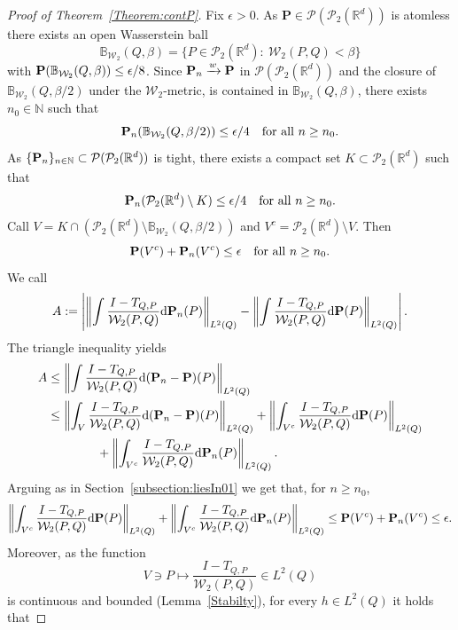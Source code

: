 \documentclass{imsart}
\numberwithin{equation}{section}
\def\N{\mathbb{N}}
\def\R{\mathbb{R}}
\def\N{\mathbb N}
\begin{document}
\begin{proof}[Proof of Theorem~\ref{Theorem:contP}]
	Fix $\epsilon>0$. As $\mathbf{P}\in \mathcal{P}(\mathcal{P}_{2}(\R^d)) $ is atomless there exists an open  Wasserstein ball
	$$ \mathbb{B}_{\mathcal{W}_2}(Q,\beta)=\{P\in \mathcal{P}_{2}(\R^d): \ \mathcal{W}_2(P,Q)< \beta\}$$
	with ${\bf P}(\mathbb{B}_{\mathcal{W}_2}(Q,\beta))\leq \epsilon/8$. Since ${\bf P}_n \xrightarrow{w} {\bf P} $ in $\mathcal{P}(\mathcal{P}_{2}(\R^d))$ and the closure of $\mathbb{B}_{\mathcal{W}_2}(Q,\beta/2)$ under the $\mathcal{W}_{2} $-metric,
	is contained in 
	$  \mathbb{B}_{\mathcal{W}_2}(Q,\beta) $,  there exists $n_0\in \N$  such that 
	$$  {\bf P}_n(\mathbb{B}_{\mathcal{W}_2}(Q,\beta/2)) \leq \epsilon/4 \quad \text{for all } n\geq n_0.$$
	As $\{{\bf P}_n\}_{n\in \N}\subset  \mathcal{P}(\mathcal{P}_{2}(\R^d)) $ is tight, there exists a compact set $K\subset \mathcal{P}_{2}(\R^d)$ such that 
	$$ {\bf P}_n(\mathcal{P}_{2}(\R^d)\setminus K) \leq \epsilon/4 \quad \text{for all } n\geq n_0. $$
	Call 
	$V= K\cap (\mathcal{P}_{2}(\R^d)\setminus \mathbb{B}_{\mathcal{W}_2}(Q,\beta/2))$ and $V^c= \mathcal{P}_{2}(\R^d)\setminus V$. Then 
	$$ {\bf P}( V^c)+ {\bf P}_n( V^c) \leq \epsilon \quad \text{for all } n\geq n_0. $$
	We call 
	$$ A:= \left| \left\| \int   \frac{I-T_{Q,P} }{\mathcal{W}_2(P,Q)} \mathrm{d}{\bf P}_n(P)\right\|_{L^2(Q)} - \left\| \int   \frac{I-T_{Q,P} }{\mathcal{W}_2(P,Q)} \mathrm{d}{\bf P}(P)\right\|_{L^2(Q)}  \right|.$$
	The triangle inequality yields 
	\begin{align*}
		A&\leq \left\| \int   \frac{I-T_{Q,P} }{\mathcal{W}_2(P,Q)} \mathrm{d}({\bf P}_n-{\bf P})(P)\right\|_{L^2(Q)}\\
		&\leq \left\| \int_{V}   \frac{I-T_{Q,P} }{\mathcal{W}_2(P,Q)} \mathrm{d}({\bf P}_n-{\bf P})(P)\right\|_{L^2(Q)}+ \left\| \int_{V^c}   \frac{I-T_{Q,P} }{\mathcal{W}_2(P,Q)} \mathrm{d}{\bf P} (P)\right\|_{L^2(Q)}\\
		&\qquad \qquad +\left\| \int_{V^c}   \frac{I-T_{Q,P} }{\mathcal{W}_2(P,Q)} \mathrm{d}{\bf P}_n (P)\right\|_{L^2(Q)}.
	\end{align*}
	Arguing as in Section~\ref{subsection:liesIn01} we get that, for $n \ge n_0$, 
	$$ \left\| \int_{V^c}   \frac{I-T_{Q,P} }{\mathcal{W}_2(P,Q)} \mathrm{d}{\bf P} (P)\right\|_{L^2(Q)} +\left\| \int_{V^c}   \frac{I-T_{Q,P} }{\mathcal{W}_2(P,Q)} \mathrm{d}{\bf P}_n (P)\right\|_{L^2(Q)}\leq {\bf P}( V^c)+ {\bf P}_n( V^c) \leq \epsilon. $$
	Moreover, as the function 
	$$ V \ni  P\mapsto  \frac{I-T_{Q,P} }{\mathcal{W}_2(P,Q)} \in  L^2(Q) $$ 
	is continuous and bounded (Lemma~\ref{Stabilty}),  for every $h\in L^2(Q)$ it holds that 

\end{proof}
\end{document}
